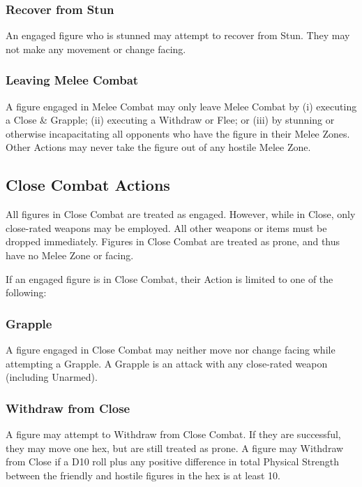 \begin{multicols*}{3}
\subsubsection{Recover from Stun}

An engaged figure who is stunned may attempt to recover from Stun.
They may not make any movement or change facing.

\subsubsection{Leaving Melee Combat}

A figure engaged in Melee Combat may only leave Melee Combat by (i)
executing a Close \& Grapple; (ii) executing a Withdraw or Flee; or
(iii) by stunning or otherwise incapacitating all opponents who have
the figure in their Melee Zones. Other Actions may never take the
figure out of any hostile Melee Zone.

\subsection{Close Combat Actions}
\label{combat:close}

All figures in Close Combat are treated as engaged. However, while in
Close, only close-rated weapons may be employed. All other weapons or
items must be dropped immediately. Figures in Close Combat are treated
as prone, and thus have no Melee Zone or facing.

If an engaged figure is in Close Combat, their Action is limited to
one of the following:

\subsubsection{Grapple}

A figure engaged in Close Combat may neither move nor change facing
while attempting a Grapple. A Grapple is an attack with any
close-rated weapon (including Unarmed).

\subsubsection{Withdraw from Close}

A figure may attempt to Withdraw from Close Combat. If they are
successful, they may move one hex, but are still treated as prone. A
figure may Withdraw from Close if a D10 roll plus any positive
difference in total Physical Strength between the friendly and hostile
figures in the hex is at least 10.


\end{multicols*}
